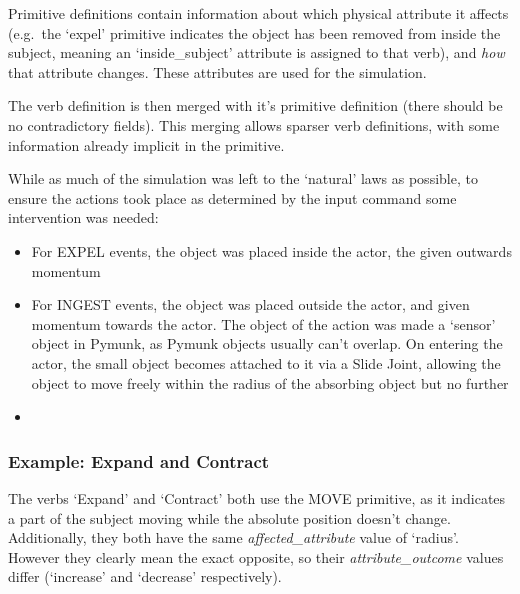 \documentclass[dissertation.tex]{subfiles}
\begin{document}
    Primitive definitions contain information about which physical attribute it affects (e.g.~the `expel' primitive indicates the object has been removed from inside the subject, meaning an `inside\_subject' attribute is assigned to that verb), and \emph{how} that attribute changes. These attributes are used for the simulation.
    
    The verb definition is then merged with it's primitive definition (there should be no contradictory fields). This merging allows sparser verb definitions, with some information already implicit in the primitive.

    While as much of the simulation was left to the `natural' laws as possible, to ensure the actions took place as determined by the input command some intervention was needed:

    \begin{itemize}
        \item For EXPEL events, the object was placed inside the actor, the given outwards momentum
        \item For INGEST events, the object was placed outside the actor, and given momentum towards the actor. The object of the action was made a `sensor' object in Pymunk, as Pymunk objects usually can't overlap. On entering the actor, the small object becomes attached to it via a Slide Joint, allowing the object to move freely within the radius of the absorbing object but no further
        \item 
    \end{itemize}

    \subsubsection{Example: Expand and Contract}
    The verbs `Expand' and `Contract' both use the MOVE primitive, as it indicates a part of the subject moving while the absolute position doesn't change. Additionally, they both have the same \emph{affected\_attribute} value of `radius'. However they clearly mean the exact opposite, so their \emph{attribute\_outcome} values differ (`increase' and `decrease' respectively).

\end{document}
